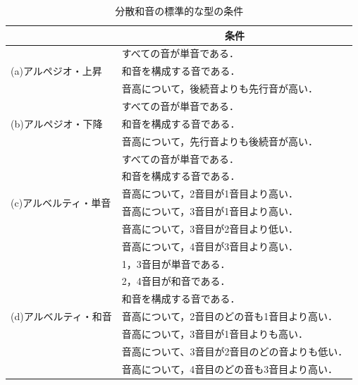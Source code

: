 \begin{table}[tbp]
  \caption{分散和音の標準的な型の条件}
  \label{tab:jyouken}
  \centering
  \begin{tabular}{|l|l|} \hline
       & \multicolumn{1}{|c|}{条件} \\ \hline

       \multirow{3}{*}{(a)アルペジオ・上昇}  &すべての音が単音である．  \\ \cline{2-2}
       &和音を構成する音である．\\ \cline{2-2}
       &音高について，後続音よりも先行音が高い．\\ \cline{1-2}

       \multirow{3}{*}{(b)アルペジオ・下降}  &すべての音が単音である．  \\ \cline{2-2}
       &和音を構成する音である．\\ \cline{2-2}
       &音高について，先行音よりも後続音が高い．\\ \cline{1-2}

       \multirow{6}{*}{(c)アルベルティ・単音}  &すべての音が単音である． \\ \cline{2-2}
       &和音を構成する音である．\\ \cline{2-2}
       &音高について，2音目が1音目より高い．\\ \cline{2-2}
       &音高について，3音目が1音目より高い．\\ \cline{2-2}
       &音高について，3音目が2音目より低い．\\ \cline{2-2}
       &音高について，4音目が3音目より高い．\\ \cline{1-2}

       \multirow{7}{*}{(d)アルベルティ・和音}  &1，3音目が単音である．  \\ \cline{2-2}
       &2，4音目が和音である．\\ \cline{2-2}
       &和音を構成する音である．\\ \cline{2-2}
       &音高について，2音目のどの音も1音目より高い．\\ \cline{2-2}
       &音高について，3音目が1音目よりも高い．\\ \cline{2-2}
       &音高について、3音目が2音目のどの音よりも低い．\\ \cline{2-2}
       &音高について，4音目のどの音も3音目より高い．\\ \cline{1-2}
  \end{tabular}
\end{table}



